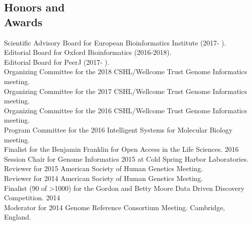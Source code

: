 \documentclass[margin,line]{cv}
\begin{document}
\begin{resume}
    \section{\mysidestyle Honors and\\Awards}
    Scientific Advisory Board for European Bioinformatics Institute (2017- ). \\\vspace{1mm}%
    Editorial Board for Oxford Bioinformatics (2016-2018). \\\vspace{1mm}%
    Editorial Board for PeerJ (2017- ). \\\vspace{1mm}%
    Organizing Committee for the 2018 CSHL/Wellcome Trust Genome Informatics meeting. \\\vspace{1mm}%
    Organizing Committee for the 2017 CSHL/Wellcome Trust Genome Informatics meeting. \\\vspace{1mm}%
    Organizing Committee for the 2016 CSHL/Wellcome Trust Genome Informatics meeting. \\\vspace{1mm}%
    Program Committee for the 2016 Intelligent Systems for Molecular Biology meeting. \\\vspace{1mm}%
    Finalist for the Benjamin Franklin for Open Access in the Life Sciences. 2016 \\\vspace{1mm}%
    Session Chair for Genome Informatics 2015 at Cold Spring Harbor Laboratories. \\\vspace{1mm}%
    Reviewer for 2015 American Society of Human Genetics Meeting. \\\vspace{1mm}%
    Reviewer for 2014 American Society of Human Genetics Meeting. \\\vspace{1mm}%
    Finalist (90 of \textgreater 1000) for the Gordon and Betty Moore Data Driven Discovery Competition. 2014 \\\vspace{1mm}%
    Moderator for 2014 Genome Reference Consortium Meeting. Cambridge, England. \\\vspace{1mm}%

\end{resume}
\end{document}
